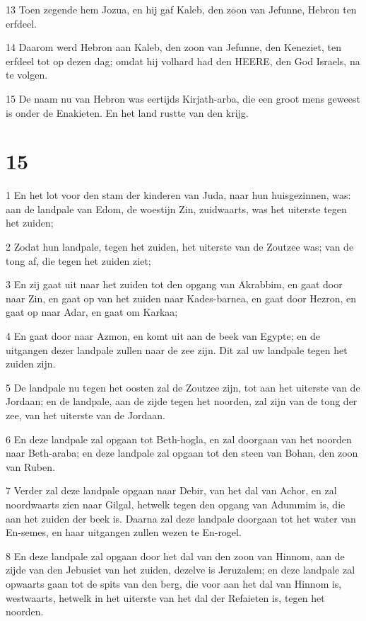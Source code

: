 \par 13 Toen zegende hem Jozua, en hij gaf Kaleb, den zoon van Jefunne, Hebron ten erfdeel.
\par 14 Daarom werd Hebron aan Kaleb, den zoon van Jefunne, den Keneziet, ten erfdeel tot op dezen dag; omdat hij volhard had den HEERE, den God Israels, na te volgen.
\par 15 De naam nu van Hebron was eertijds Kirjath-arba, die een groot mens geweest is onder de Enakieten. En het land rustte van den krijg.

\chapter{15}

\par 1 En het lot voor den stam der kinderen van Juda, naar hun huisgezinnen, was: aan de landpale van Edom, de woestijn Zin, zuidwaarts, was het uiterste tegen het zuiden;
\par 2 Zodat hun landpale, tegen het zuiden, het uiterste van de Zoutzee was; van de tong af, die tegen het zuiden ziet;
\par 3 En zij gaat uit naar het zuiden tot den opgang van Akrabbim, en gaat door naar Zin, en gaat op van het zuiden naar Kades-barnea, en gaat door Hezron, en gaat op naar Adar, en gaat om Karkaa;
\par 4 En gaat door naar Azmon, en komt uit aan de beek van Egypte; en de uitgangen dezer landpale zullen naar de zee zijn. Dit zal uw landpale tegen het zuiden zijn.
\par 5 De landpale nu tegen het oosten zal de Zoutzee zijn, tot aan het uiterste van de Jordaan; en de landpale, aan de zijde tegen het noorden, zal zijn van de tong der zee, van het uiterste van de Jordaan.
\par 6 En deze landpale zal opgaan tot Beth-hogla, en zal doorgaan van het noorden naar Beth-araba; en deze landpale zal opgaan tot den steen van Bohan, den zoon van Ruben.
\par 7 Verder zal deze landpale opgaan naar Debir, van het dal van Achor, en zal noordwaarts zien naar Gilgal, hetwelk tegen den opgang van Adummim is, die aan het zuiden der beek is. Daarna zal deze landpale doorgaan tot het water van En-semes, en haar uitgangen zullen wezen te En-rogel.
\par 8 En deze landpale zal opgaan door het dal van den zoon van Hinnom, aan de zijde van den Jebusiet van het zuiden, dezelve is Jeruzalem; en deze landpale zal opwaarts gaan tot de spits van den berg, die voor aan het dal van Hinnom is, westwaarts, hetwelk in het uiterste van het dal der Refaieten is, tegen het noorden.
